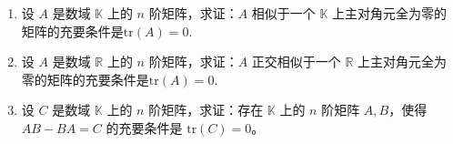 \documentclass[../../main.tex]{subfiles}%
\begin{document}
\begin{proposition}[迹0矩阵的性质]\label{proposition:迹零阵必相似于主对角全为零的矩阵}
\begin{enumerate}[(1)]
\item 设 $A$ 是数域 $\mathbb{K}$ 上的 $n$ 阶矩阵，求证：$A$ 相似于一个 $\mathbb{K}$ 上主对角元全为零的矩阵的充要条件是$\mathrm{tr}(A)=0$.

\item 设 $A$ 是数域 $\mathbb{R}$ 上的 $n$ 阶矩阵，求证：$A$ 正交相似于一个 $\mathbb{R}$ 上主对角元全为零的矩阵的充要条件是$\mathrm{tr}(A)=0$.

\item 设 $C$ 是数域 $\mathbb{K}$ 上的 $n$ 阶矩阵，求证：存在 $\mathbb{K}$ 上的 $n$ 阶矩阵 $A,B$，使得 $AB - BA = C$ 的充要条件是 $\mathrm{tr}(C)=0$。
\end{enumerate}
\end{proposition}
\end{document}

